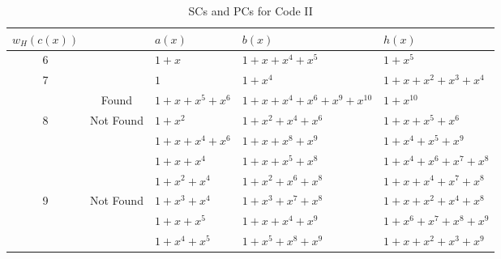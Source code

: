 \begin{table}[htbp]
		\caption{SCs and PCs for Code II}
		\centering
		\begin{tabularx}{1\textwidth}{|c|c|XXX} 
			\toprule
			$w_H(c(x))$&~& $a(x)$ & $b(x)$ & $h(x)$ \\ %
			\midrule
			6&~&$1+x$ & $1+x+x^{4}+x^5$ & $1+x^5$\\
			\cline{2-5}
			7&~&$1$ & $1+x^4$ & $1+x+x^2+x^3+x^4$\\
			\cline{1-5}
			&Found&$1+x+x^5+x^6$ & $1+x+x^4+x^6+x^9+x^{10}$ & $1+x^{10}$\\
			\cline{2-5}
			8&Not Found&$1+x^2$ 				&$1+x^2+x^4+x^6$ 		& $1+x+x^5+x^6$\\
			&~&$1+x+x^4+x^6$ 		&$1+x+x^8+x^9$			& $1+x^4+x^5+x^9$\\
			\cline{1-5}
			&&$1+x+x^4$ 		&$1+x+x^5+x^8$ 		& $1+x^4+x^6+x^7+x^8$\\
			&&$1+x^2+x^4$ 		&$1+x^2+x^6+x^8$ 		& $1+x+x^4+x^7+x^8$\\
			9&Not Found&$1+x^3+x^4$ 	&$1+x^3+x^7+x^8$ 		& $1+x+x^2+x^4+x^8$\\
			&&$1+x+x^5$ 		&$1+x+x^4+x^9$ 		& $1+x^6+x^7+x^8+x^9$\\
			&&$1+x^4+x^5$ 		&$1+x^5+x^8+x^9$ 		& $1+x+x^2+x^3+x^9$\\
			\bottomrule
		\end{tabularx}		
		\label{code-tables-2}
	\end{table}


